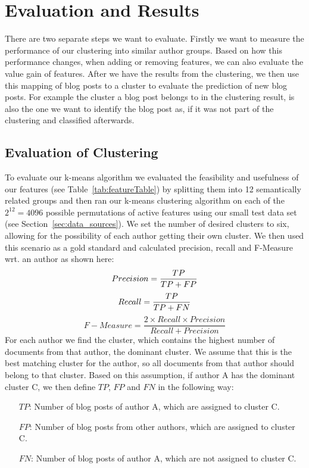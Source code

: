 \section{Evaluation and Results}
\label{sec:results}


There are two separate steps we want to evaluate.
Firstly we want to measure the performance of our clustering into similar author groups.
Based on how this performance changes, when adding or removing features, we can also evaluate the value gain of features.
After we have the results from the clustering, we then use this mapping of blog posts to a cluster to evaluate the prediction of new blog posts.
For example the cluster a blog post belongs to in the clustering result, is also the one we want to identify the blog post as, if it was not part of the clustering and classified afterwards.


\subsection{Evaluation of Clustering}
\label{sec:evaluation_clustering}
To evaluate our k-means algorithm we evaluated the feasibility and usefulness of our features (see Table~\ref{tab:featureTable}) by splitting them into 12 semantically related groups and then ran our k-means clustering algorithm on each of the $2^{12} = 4096$ possible permutations of active features using our small test data set (see Section~\ref{sec:data_sources}).
We set the number of desired clusters to six, allowing for the possibility of each author getting their own cluster.
We then used this scenario as a gold standard and calculated precision, recall and F-Measure wrt. an author as shown here:
\begin{equation}
	Precision = \frac{TP}{TP + FP} \\
	\label{eq:precision}
\end{equation}
\begin{equation}
	Recall = \frac{TP}{TP + FN} \\
	\label{eq:recall}
\end{equation}
\begin{equation}
	F-Measure = \frac{2 \times Recall \times Precision}{Recall + Precision}
	\label{eq:fMeasure}
\end{equation}
For each author we find the cluster, which contains the highest number of documents from that author, the dominant cluster.
We assume that this is the best matching cluster for the author, so all documents from that author should belong to that cluster.
Based on this assumption, if author A has the dominant cluster C, we then define $TP$, $FP$ and $FN$ in the following way:
\begin{itemize}
	\item[$TP$:] Number of blog posts of author A, which are assigned to cluster C. \\
	\item[$FP$:] Number of blog posts from other authors, which are assigned to cluster C. \\
	\item[$FN$:] Number of blog posts of author A, which are not assigned to cluster C.
\end{itemize}

